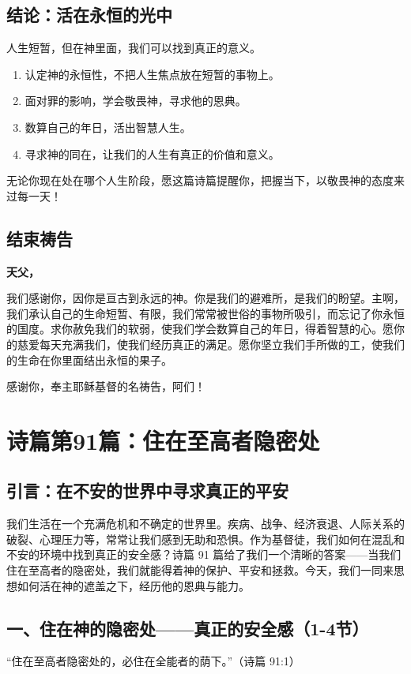 \documentclass[a4paper, 12pt]{article}
\begin{document}
\subsection*{结论：活在永恒的光中}
人生短暂，但在神里面，我们可以找到真正的意义。
\begin{enumerate}
    \item 认定神的永恒性，不把人生焦点放在短暂的事物上。

    \item 面对罪的影响，学会敬畏神，寻求他的恩典。

    \item 数算自己的年日，活出智慧人生。

    \item 寻求神的同在，让我们的人生有真正的价值和意义。

    
\end{enumerate}

无论你现在处在哪个人生阶段，愿这篇诗篇提醒你，把握当下，以敬畏神的态度来过每一天！

\subsection*{结束祷告}
\textbf{天父，}

我们感谢你，因你是亘古到永远的神。你是我们的避难所，是我们的盼望。主啊，我们承认自己的生命短暂、有限，我们常常被世俗的事物所吸引，而忘记了你永恒的国度。求你赦免我们的软弱，使我们学会数算自己的年日，得着智慧的心。愿你的慈爱每天充满我们，使我们经历真正的满足。愿你坚立我们手所做的工，使我们的生命在你里面结出永恒的果子。

感谢你，奉主耶稣基督的名祷告，阿们！
\newpage
\section{诗篇第91篇：住在至高者隐密处}
\subsection*{引言：在不安的世界中寻求真正的平安}
我们生活在一个充满危机和不确定的世界里。疾病、战争、经济衰退、人际关系的破裂、心理压力等，常常让我们感到无助和恐惧。作为基督徒，我们如何在混乱和不安的环境中找到真正的安全感？诗篇 91 篇给了我们一个清晰的答案——当我们住在至高者的隐密处，我们就能得着神的保护、平安和拯救。今天，我们一同来思想如何活在神的遮盖之下，经历他的恩典与能力。

\subsection*{一、住在神的隐密处——真正的安全感（1-4节）}
“住在至高者隐密处的，必住在全能者的荫下。”（诗篇 91:1）
\end{document}
